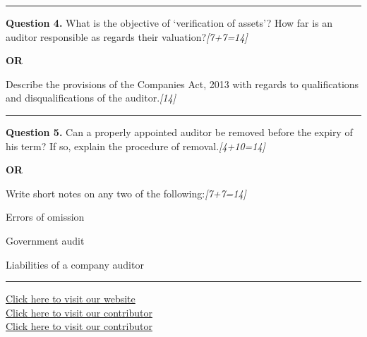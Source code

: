 \documentclass[11pt,a4paper]{article}
\newcommand{\pts}[1]{\hfill   \textit{[#1]}}
\begin{document}
\medskip\rule{\linewidth}{0.2pt}




\noindent   \textbf{Question 4.}
What is the objective of `verification of assets'? How far is an auditor responsible as regards their valuation?\pts{7+7=14}

\centerline{   \textbf{OR}}

Describe the provisions of the Companies Act, 2013 with regards to qualifications and disqualifications of the auditor.\pts{14}

\medskip\rule{\linewidth}{0.2pt}




\noindent   \textbf{Question 5.}
Can a properly appointed auditor be removed before the expiry of his term? If so, explain the procedure of removal.\pts{4+10=14}

\centerline{   \textbf{OR}}

Write short notes on any two of the following:\pts{7+7=14}

\begin{parts}
  \item Errors of omission
  \item Government audit
  \item Liabilities of a company auditor
\end{parts}

\vfill
\rule{\linewidth}{0.4pt}

\begin{center}\small
\href{https://bhu-exam.vercel.app/}{Click here to visit our website}\\[4pt]
\href{https://me-aryan.vercel.app/}{Click here to visit our contributor}\\[4pt]
\href{https://quashan-me.vercel.app/}{Click here to visit our contributor}
\end{center}
\end{document}
